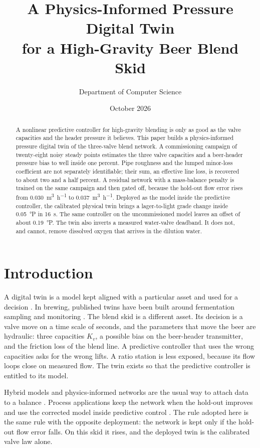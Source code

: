 \documentclass[11pt,a4paper]{article}
\title{A Physics-Informed Pressure Digital Twin\\ for a High-Gravity Beer Blend Skid}
\author{Department of Computer Science}
\date{October 2026}
\begin{document}
\maketitle
\begin{abstract}
\noindent
A nonlinear predictive controller for high-gravity blending is only as good as the valve capacities and the header pressure it believes. This paper builds a physics-informed pressure digital twin of the three-valve blend network. A commissioning campaign of twenty-eight noisy steady points estimates the three valve capacities and a beer-header pressure bias to well inside one percent. Pipe roughness and the lumped minor-loss coefficient are not separately identifiable; their sum, an effective line loss, is recovered to about two and a half percent. A residual network with a mass-balance penalty is trained on the same campaign and then gated off, because the hold-out flow error rises from \SI{0.030}{\cubic\metre\per\hour} to \SI{0.037}{\cubic\metre\per\hour}. Deployed as the model inside the predictive controller, the calibrated physical twin brings a lager-to-light grade change inside \SI{0.05}{\degree}P in \SI{16}{\second}. The same controller on the uncommissioned model leaves an offset of about \SI{0.19}{\degree}P. The twin also inverts a measured water-valve deadband. It does not, and cannot, remove dissolved oxygen that arrives in the dilution water.
\end{abstract}

\section{Introduction}
A digital twin is a model kept aligned with a particular asset and used for a decision \citep{kritzinger2018}. In brewing, published twins have been built around fermentation sampling and monitoring \citep{goffi2025}. The blend skid is a different asset. Its decision is a valve move on a time scale of seconds, and the parameters that move the beer are hydraulic: three capacities $K_v$, a possible bias on the beer-header transmitter, and the friction loss of the blend line. A predictive controller that uses the wrong capacities asks for the wrong lifts. A ratio station is less exposed, because its flow loops close on measured flow. The twin exists so that the predictive controller is entitled to its model.

Hybrid models and physics-informed networks are the usual way to attach data to a balance \citep{vonstosch2014,raissi2019,karniadakis2021}. Process applications keep the network when the hold-out improves and use the corrected model inside predictive control \citep{zheng2023,wu2023cerd}. The rule adopted here is the same rule with the opposite deployment: the network is kept only if the hold-out flow error falls. On this skid it rises, and the deployed twin is the calibrated valve law alone.
\end{document}
